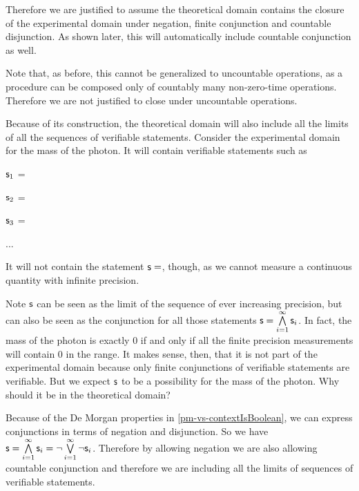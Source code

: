 \begin{mathSection}
\begin{justification}
			Therefore we are justified to assume the theoretical domain contains the closure of the experimental domain under negation, finite conjunction and countable disjunction. As shown later, this will automatically include countable conjunction as well.
			
			Note that, as before, this cannot be generalized to uncountable operations, as a procedure can be composed only of countably many non-zero-time operations. Therefore we are not justified to close under uncountable operations.
		\end{justification}
	\end{mathSection}
	
	Because of its construction, the theoretical domain will also include all the limits of all the sequences of verifiable statements. Consider the experimental domain for the mass of the photon. It will contain verifiable statements such as
	\begin{description}
		\item $\mathsf{s}_1$ =
		\item $\mathsf{s}_2$ =
		\item $\mathsf{s}_3$ =
		\item ...
	\end{description}
	It will not contain the statement $\mathsf{s}=$, though, as we cannot measure a continuous quantity with infinite precision.
	
	Note $\mathsf{s}$ can be seen as the limit of the sequence of ever increasing precision, but can also be seen as the conjunction for all those statements $\mathsf{s}=\bigwedge\limits_{i=1}^{\infty} \mathsf{s}_i$. In fact, the mass of the photon is exactly 0 if and only if all the finite precision measurements will contain 0 in the range. It makes sense, then, that it is not part of the experimental domain because only finite conjunctions of verifiable statements are verifiable. But we expect $\mathsf{s}$ to be a possibility for the mass of the photon. Why should it be in the theoretical domain?
	
	Because of the De Morgan properties in \ref{pm-vs-contextIsBoolean}, we can express conjunctions in terms of negation and disjunction. So we have $\mathsf{s}=\bigwedge\limits_{i=1}^{\infty} \mathsf{s}_i=\neg \bigvee\limits_{i=1}^{\infty} \neg\mathsf{s}_i$. Therefore by allowing negation we are also allowing countable conjunction and therefore we are including all the limits of sequences of verifiable statements.
	

